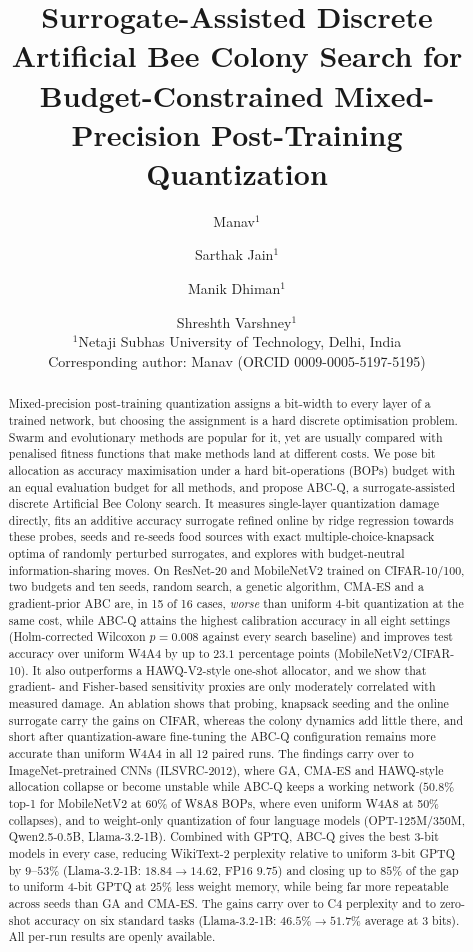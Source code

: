 \documentclass[11pt,a4paper]{article}
\title{Surrogate-Assisted Discrete Artificial Bee Colony Search for\\
Budget-Constrained Mixed-Precision Post-Training Quantization}
\author{Manav$^{1}$ \and Sarthak Jain$^{1}$ \and Manik Dhiman$^{1}$ \and Shreshth Varshney$^{1}$\\[4pt]
\small $^{1}$Netaji Subhas University of Technology, Delhi, India\\
\small Corresponding author: Manav (ORCID 0009-0005-5197-5195)}
\date{}
\begin{document}
\maketitle

\begin{abstract}
Mixed-precision post-training quantization assigns a bit-width to every layer of a trained network,
but choosing the assignment is a hard discrete optimisation problem. Swarm and evolutionary methods
are popular for it, yet are usually compared with penalised fitness functions that make methods land
at different costs. We pose bit allocation as accuracy maximisation under a hard bit-operations (BOPs)
budget with an equal evaluation budget for all methods, and propose ABC-Q, a surrogate-assisted
discrete Artificial Bee Colony search. It measures single-layer quantization damage directly, fits an
additive accuracy surrogate refined online by ridge regression towards these probes, seeds and
re-seeds food sources with exact multiple-choice-knapsack optima of randomly perturbed surrogates,
and explores with budget-neutral information-sharing moves. On ResNet-20 and MobileNetV2 trained on
CIFAR-10/100, two budgets and ten seeds, random search, a genetic algorithm, CMA-ES and a gradient-prior
ABC are, in 15 of 16 cases, \emph{worse} than uniform 4-bit quantization at the same cost, while
ABC-Q attains the highest calibration accuracy in all eight settings (Holm-corrected Wilcoxon
$p=0.008$ against every search baseline) and improves test accuracy over uniform W4A4 by up to
$23.1$ percentage points (MobileNetV2/CIFAR-10). It also outperforms a HAWQ-V2-style one-shot
allocator, and we show that gradient- and Fisher-based sensitivity proxies are only moderately
correlated with measured damage. An ablation shows that probing, knapsack seeding and the online
surrogate carry the gains on CIFAR, whereas the colony dynamics add little there, and short
after quantization-aware fine-tuning the ABC-Q configuration remains more accurate than uniform W4A4 in
all 12 paired runs. The findings carry over to ImageNet-pretrained CNNs (ILSVRC-2012), where GA, CMA-ES and HAWQ-style
allocation collapse or become unstable while ABC-Q keeps a working network ($50.8\%$ top-1 for MobileNetV2
at 60\% of W8A8 BOPs, where even uniform W4A8 at 50\% collapses), and to weight-only quantization of four
language models (OPT-125M/350M, Qwen2.5-0.5B, Llama-3.2-1B). Combined with GPTQ, ABC-Q gives the best
3-bit models in every case, reducing WikiText-2 perplexity relative to uniform 3-bit GPTQ by $9$--$53\%$
(Llama-3.2-1B: $18.84\to14.62$, FP16 $9.75$) and closing up to $85\%$ of the gap to uniform 4-bit GPTQ at
$25\%$ less weight memory, while being far more repeatable across seeds than GA and CMA-ES. The gains
carry over to C4 perplexity and to zero-shot accuracy on six standard tasks (Llama-3.2-1B: $46.5\%\to51.7\%$
average at 3 bits). All per-run results are openly available.
\end{abstract}
\end{document}
